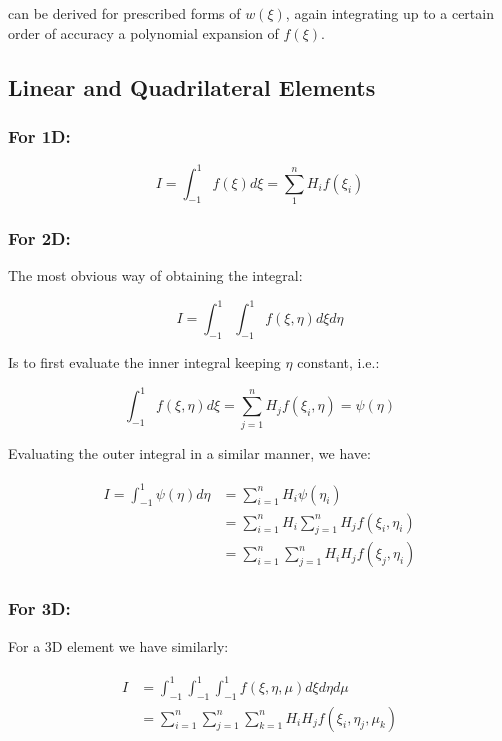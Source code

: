 \documentclass[10pt,b5paper,titlepage]{book}
\newenvironment{eqarray}
{
    \begin{eqnarray}
        \begin{aligned}
}
{
        \end{aligned}
    \end{eqnarray}
}
\begin{document}
can be derived for prescribed forms of $ w(\xi) $, again integrating up to a certain
order of accuracy a polynomial expansion of $ f(\xi) $.


\subsection{Linear and Quadrilateral Elements}

\subsubsection{For 1D:}

\begin{equation}
    I = \int_{-1}^{1} f(\xi) d\xi = \sum_1^n H_i f(\xi_i)
\end{equation}


\subsubsection{For 2D:}

The most obvious way of obtaining the integral:

\begin{equation}
    I = \int_{-1}^{1} \int_{-1}^{1} f(\xi, \eta) d\xi d\eta
\end{equation}

Is to first evaluate the inner integral keeping $ \eta $ constant, i.e.:

\begin{equation}
    \int_{-1}^{1}f(\xi, \eta) d\xi = \sum_{j=1}^n H_j f(\xi_i, \eta) = \psi(\eta)
\end{equation}

Evaluating the outer integral in a similar manner, we have:

\begin{eqarray}
    I = \int_{-1}^{1} \psi(\eta) d\eta
    &= \sum_{i=1}^n H_i \psi(\eta_i)\\
    &= \sum_{i=1}^n H_i \sum_{j=1}^n H_j f(\xi_i,\eta_i)\\
    &= \sum_{i=1}^n \sum_{j=1}^n H_i H_j f(\xi_j,\eta_i)
\end{eqarray}

\subsubsection{For 3D:}
For a 3D element we have similarly:

\begin{eqarray}
    I &= \int_{-1}^{1} \int_{-1}^{1} \int_{-1}^{1} f(\xi, \eta, \mu) d\xi d\eta d\mu\\
    &= \sum_{i=1}^n \sum_{j=1}^n \sum_{k=1}^n H_i H_j f(\xi_i,\eta_j,\mu_k)
\end{eqarray}
\end{document}
